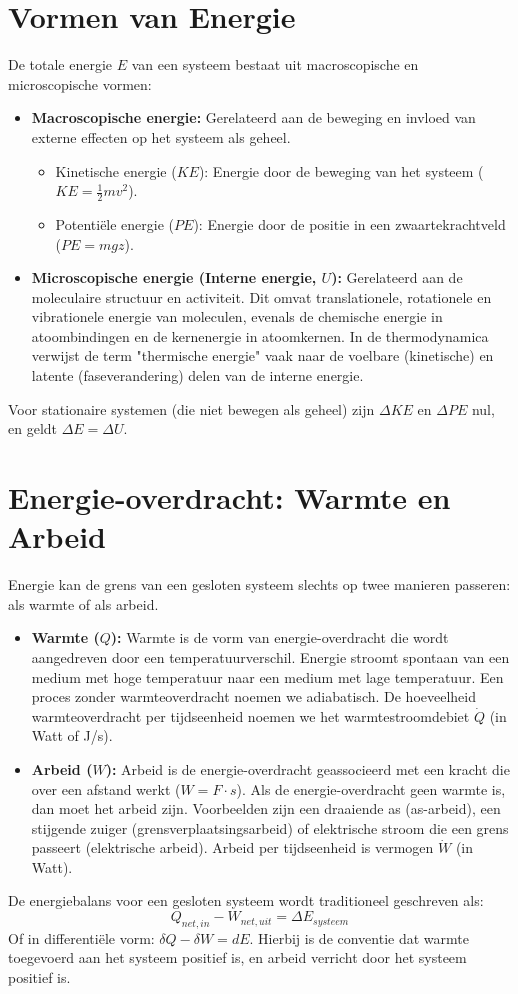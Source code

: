 \documentclass[a4paper,11pt,twoside]{report}
\begin{document}
\section{Vormen van Energie}
De totale energie $E$ van een systeem bestaat uit macroscopische en microscopische vormen:
\begin{itemize}
    \item \textbf{Macroscopische energie:} Gerelateerd aan de beweging en invloed van externe effecten op het systeem als geheel.
    \begin{itemize}
        \item Kinetische energie ($KE$): Energie door de beweging van het systeem ($KE = \frac{1}{2}mv^2$).
        \item Potentiële energie ($PE$): Energie door de positie in een zwaartekrachtveld ($PE = mgz$).
    \end{itemize}
    \item \textbf{Microscopische energie (Interne energie, $U$):} Gerelateerd aan de moleculaire structuur en activiteit. Dit omvat translationele, rotationele en vibrationele energie van moleculen, evenals de chemische energie in atoombindingen en de kernenergie in atoomkernen. In de thermodynamica verwijst de term "thermische energie" vaak naar de voelbare (kinetische) en latente (faseverandering) delen van de interne energie.
\end{itemize}
Voor stationaire systemen (die niet bewegen als geheel) zijn $\Delta KE$ en $\Delta PE$ nul, en geldt $\Delta E = \Delta U$.

\section{Energie-overdracht: Warmte en Arbeid}
Energie kan de grens van een gesloten systeem slechts op twee manieren passeren: als warmte of als arbeid.
\begin{itemize}
    \item \textbf{Warmte ($Q$):} Warmte is de vorm van energie-overdracht die wordt aangedreven door een temperatuurverschil. Energie stroomt spontaan van een medium met hoge temperatuur naar een medium met lage temperatuur. Een proces zonder warmteoverdracht noemen we adiabatisch. De hoeveelheid warmteoverdracht per tijdseenheid noemen we het warmtestroomdebiet $\dot{Q}$ (in Watt of J/s).
    \item \textbf{Arbeid ($W$):} Arbeid is de energie-overdracht geassocieerd met een kracht die over een afstand werkt ($W = F \cdot s$). Als de energie-overdracht geen warmte is, dan moet het arbeid zijn. Voorbeelden zijn een draaiende as (as-arbeid), een stijgende zuiger (grensverplaatsingsarbeid) of elektrische stroom die een grens passeert (elektrische arbeid). Arbeid per tijdseenheid is vermogen $\dot{W}$ (in Watt).
\end{itemize}
De energiebalans voor een gesloten systeem wordt traditioneel geschreven als:
\[
Q_{net, in} - W_{net, uit} = \Delta E_{systeem}
\]
Of in differentiële vorm: $\delta Q - \delta W = dE$. Hierbij is de conventie dat warmte toegevoerd aan het systeem positief is, en arbeid verricht door het systeem positief is.
\end{document}
